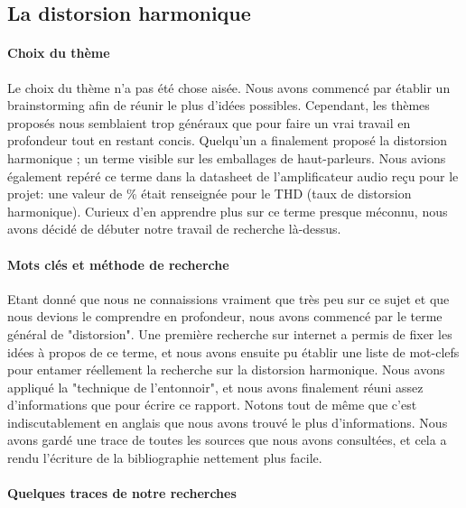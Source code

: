 \subsection{La distorsion harmonique}

\paragraph{Choix du thème}
Le choix du thème n'a pas été chose aisée. Nous avons commencé par établir un brainstorming afin de réunir 
le plus d'idées possibles. Cependant, les thèmes proposés nous semblaient trop généraux que pour faire un vrai 
travail en profondeur tout en restant concis. Quelqu'un a finalement proposé la distorsion harmonique ; un 
terme visible sur les emballages de haut-parleurs. Nous avions également repéré ce terme dans la datasheet 
de l'amplificateur audio reçu pour le projet: une valeur de \% était renseignée pour le THD 
(taux de distorsion harmonique). Curieux d'en apprendre plus sur ce terme presque méconnu, 
nous avons décidé de débuter notre travail de recherche là-dessus.

\paragraph{Mots clés et méthode de recherche}
Etant donné que nous ne connaissions vraiment que très peu sur ce sujet et que nous 
devions le comprendre en profondeur, nous avons commencé par le terme général de "distorsion".
Une première recherche sur internet a permis de fixer les idées à propos de ce terme, et nous 
avons ensuite pu établir une liste de mot-clefs pour entamer réellement la recherche sur la 
distorsion harmonique. Nous avons appliqué la "technique de l'entonnoir", et nous avons finalement 
réuni assez d'informations que pour écrire ce rapport. Notons tout de même que c'est indiscutablement
en anglais que nous avons 
trouvé le plus d'informations. Nous avons gardé une trace de toutes les sources que nous avons 
consultées, et cela a rendu l'écriture de la bibliographie nettement plus facile.

\paragraph{Quelques traces de notre recherches}


